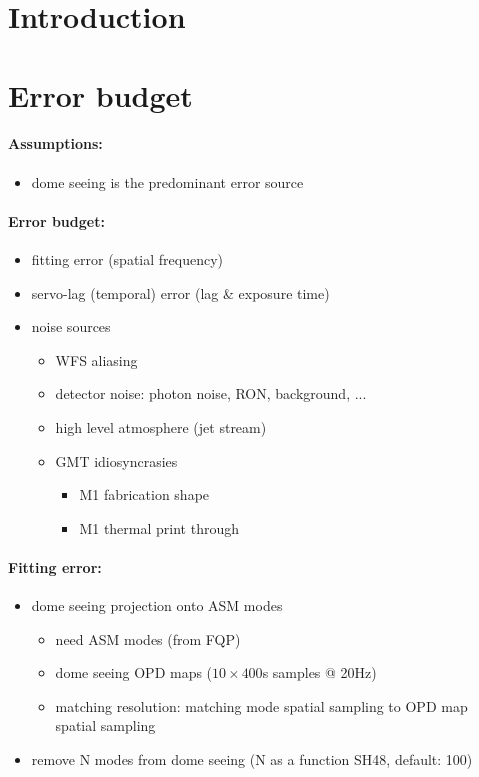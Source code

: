 \documentclass{gmto}
\begin{document}
\section{Introduction}
\label{sec:introduction}

\section{Error budget}
\label{sec:error-budget}

\paragraph{Assumptions:}
\begin{itemize}
\item dome seeing is the predominant error source
\end{itemize}

\paragraph{Error budget:}
\begin{itemize}
\item fitting error (spatial frequency)
\item servo-lag (temporal) error (lag \& exposure time)
\item noise sources
  \begin{itemize}
  \item WFS aliasing
  \item detector noise: photon noise, RON, background, ...
  \item high level atmosphere (jet stream)
  \item GMT idiosyncrasies
    \begin{itemize}
    \item M1 fabrication shape
    \item M1 thermal print through
    \end{itemize}
  \end{itemize}
\end{itemize}

\paragraph{Fitting error:}

\begin{itemize}
\item dome seeing projection onto ASM modes
  \begin{itemize}
  \item need ASM modes (from FQP)
  \item dome seeing OPD maps ($10\times 400$s samples @ 20Hz)
  \item matching resolution: matching mode spatial sampling to OPD map spatial sampling
  \end{itemize}
\item remove N modes from dome seeing (N as a function SH48, default: 100)
\end{itemize}
\end{document}
